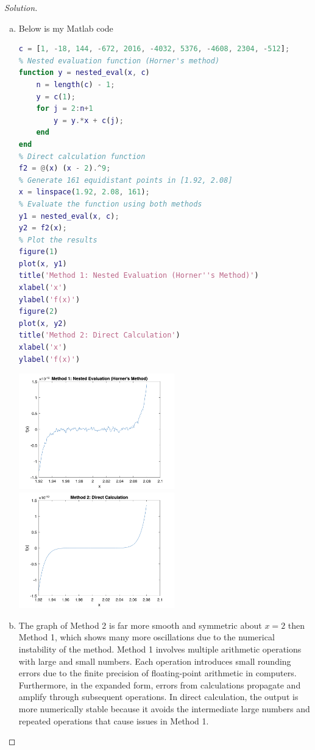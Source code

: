 \documentclass[12pt]{scrartcl}
\begin{document}
\begin{proof}[Solution]
\hfill

\begin{enumerate}[(a)]
  \item Below is my Matlab code
  
  \begin{lstlisting}[language=Matlab]
% Define the polynomial coefficients
c = [1, -18, 144, -672, 2016, -4032, 5376, -4608, 2304, -512];
% Nested evaluation function (Horner's method)
function y = nested_eval(x, c)
    n = length(c) - 1;
    y = c(1);
    for j = 2:n+1
        y = y.*x + c(j);
    end
end
% Direct calculation function
f2 = @(x) (x - 2).^9;
% Generate 161 equidistant points in [1.92, 2.08]
x = linspace(1.92, 2.08, 161);
% Evaluate the function using both methods
y1 = nested_eval(x, c);
y2 = f2(x);
% Plot the results
figure(1)
plot(x, y1)
title('Method 1: Nested Evaluation (Horner''s Method)')
xlabel('x')
ylabel('f(x)')
figure(2)
plot(x, y2)
title('Method 2: Direct Calculation')
xlabel('x')
ylabel('f(x)')
  \end{lstlisting}

  \begin{center}
    \includegraphics[width=6.75cm]{method1.png}
    \includegraphics[width=6.75cm]{method2.png}
  \end{center}

\item The graph of Method 2 is far more smooth and symmetric about $x=2$ then Method 1, which shows 
many more oscillations due to the numerical instability of the method. Method 1 involves multiple arithmetic operations 
with large and small numbers. Each operation introduces small rounding errors due to the 
finite precision of floating-point arithmetic in computers. Furthermore, in the expanded form, errors 
from calculations propagate and amplify through subsequent operations. In direct calculation, the output 
is more numerically stable because it avoids the intermediate large numbers and repeated operations that 
cause issues in Method 1. 


\end{enumerate}
\end{proof}
\end{document}
